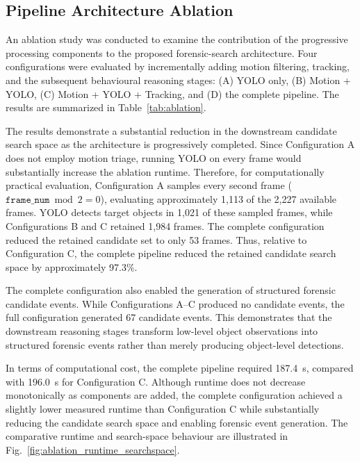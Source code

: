 \documentclass[runningheads]{llncs}
\begin{document}
\subsection{Pipeline Architecture Ablation}

An ablation study was conducted to examine the contribution of the
progressive processing components to the proposed forensic-search
architecture. Four configurations were evaluated by incrementally
adding motion filtering, tracking, and the subsequent behavioural
reasoning stages: (A) YOLO only, (B) Motion + YOLO, (C) Motion + YOLO +
Tracking, and (D) the complete pipeline. The results are summarized in
Table~\ref{tab:ablation}.

The results demonstrate a substantial reduction in the downstream
candidate search space as the architecture is progressively completed.  Since
Configuration A does not employ motion triage, running YOLO on every
frame would substantially increase the ablation runtime. Therefore,
for computationally practical evaluation, Configuration A samples every
second frame ($\texttt{frame\_num}\bmod 2=0$), evaluating approximately
1,113 of the 2,227 available frames. YOLO detects target objects in
1,021 of these sampled frames, while Configurations B
and C retained 1,984 frames. The complete configuration reduced the
retained candidate set to only 53 frames. Thus, relative to
Configuration C, the complete pipeline reduced the retained candidate
search space by approximately 97.3\%.

The complete configuration also enabled the generation of structured
forensic candidate events. While Configurations A--C produced no
candidate events, the full configuration generated 67 candidate events.
This demonstrates that the downstream reasoning stages transform
low-level object observations into structured forensic events rather
than merely producing object-level detections.

In terms of computational cost, the complete pipeline required
187.4~s, compared with 196.0~s for Configuration C. Although runtime
does not decrease monotonically as components are added, the complete
configuration achieved a slightly lower measured runtime than
Configuration C while substantially reducing the candidate search space
and enabling forensic event generation. The comparative runtime and
search-space behaviour are illustrated in
Fig.~\ref{fig:ablation_runtime_searchspace}.
\end{document}
